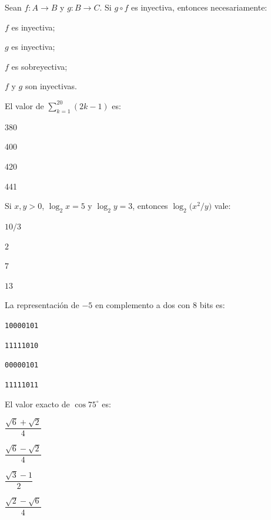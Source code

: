 \begin{cuestiones}
\item {} Sean $f\colon A\to B$ y $g\colon B\to C$. Si $g\circ f$ es inyectiva, entonces necesariamente:
\begin{opciones}
  \item $f$ es inyectiva;
  \item $g$ es inyectiva;
  \item $f$ es sobreyectiva;
  \item $f$ y $g$ son inyectivas.
\end{opciones}

\item {} El valor de $\displaystyle\sum_{k=1}^{20}(2k-1)$ es:
\begin{opciones}
  \item 380
  \item 400
  \item 420
  \item 441
\end{opciones}

\item {} Si $x,y>0$, $\log_2 x=5$ y $\log_2 y=3$, entonces $\log_2\bigl(x^{2}/y\bigr)$ vale:
\begin{opciones}
  \item $10/3$
  \item $2$
  \item $7$
  \item $13$
\end{opciones}

\item {} La representación de $-5$ en complemento a dos con 8 bits es:
\begin{opciones}
  \item \texttt{10000101}
  \item \texttt{11111010}
  \item \texttt{00000101}
  \item \texttt{11111011}
\end{opciones}

\item {} El valor exacto de $\cos 75^{\circ}$ es:
\begin{opciones}
  \item $\dfrac{\sqrt6+\sqrt2}{4}$
  \item $\dfrac{\sqrt6-\sqrt2}{4}$
  \item $\dfrac{\sqrt3-1}{2}$
  \item $\dfrac{\sqrt2-\sqrt6}{4}$
\end{opciones}


\end{cuestiones}
